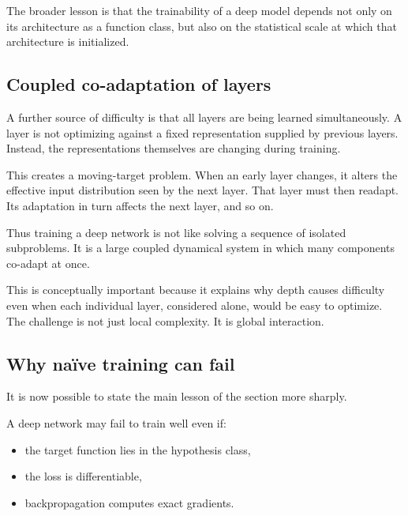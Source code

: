\medskip

The broader lesson is that the trainability of a deep model depends not only on its architecture as a function class, but also on the statistical scale at which that architecture is initialized.

\subsection*{Coupled co-adaptation of layers}

A further source of difficulty is that all layers are being learned simultaneously.
A layer is not optimizing against a fixed representation supplied by previous layers.
Instead, the representations themselves are changing during training.

\medskip

This creates a moving-target problem.
When an early layer changes, it alters the effective input distribution seen by the next layer.
That layer must then readapt.
Its adaptation in turn affects the next layer, and so on.

\medskip

Thus training a deep network is not like solving a sequence of isolated subproblems.
It is a large coupled dynamical system in which many components co-adapt at once.

\medskip

This is conceptually important because it explains why depth causes difficulty even when each individual layer, considered alone, would be easy to optimize.
The challenge is not just local complexity.
It is global interaction.

\subsection*{Why naïve training can fail}

It is now possible to state the main lesson of the section more sharply.

\medskip

A deep network may fail to train well even if:
\begin{itemize}
    \item the target function lies in the hypothesis class,
    \item the loss is differentiable,
    \item backpropagation computes exact gradients.
\end{itemize}

\medskip

